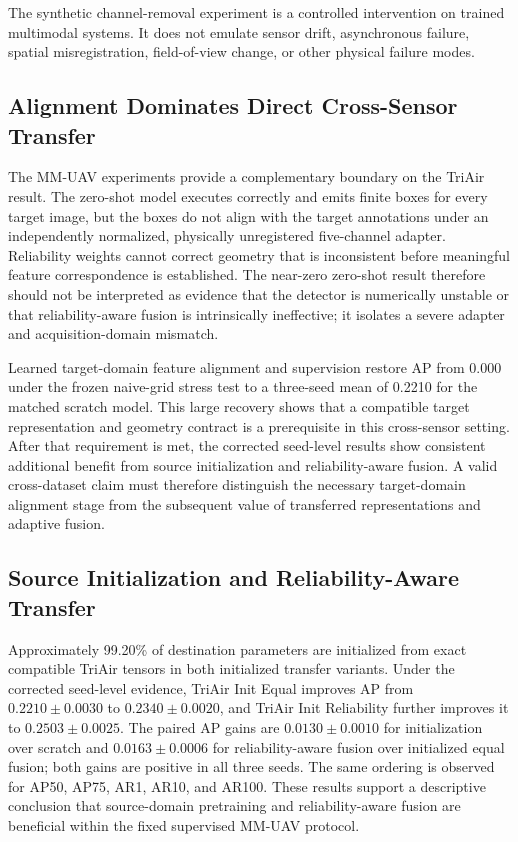 The synthetic channel-removal experiment is a controlled intervention on trained multimodal systems. It does not emulate sensor drift, asynchronous failure, spatial misregistration, field-of-view change, or other physical failure modes.

\subsection{Alignment Dominates Direct Cross-Sensor Transfer}
The MM-UAV experiments provide a complementary boundary on the TriAir result. The zero-shot model executes correctly and emits finite boxes for every target image, but the boxes do not align with the target annotations under an independently normalized, physically unregistered five-channel adapter. Reliability weights cannot correct geometry that is inconsistent before meaningful feature correspondence is established. The near-zero zero-shot result therefore should not be interpreted as evidence that the detector is numerically unstable or that reliability-aware fusion is intrinsically ineffective; it isolates a severe adapter and acquisition-domain mismatch.

Learned target-domain feature alignment and supervision restore AP from 0.000 under the frozen naive-grid stress test to a three-seed mean of 0.2210 for the matched scratch model. This large recovery shows that a compatible target representation and geometry contract is a prerequisite in this cross-sensor setting. After that requirement is met, the corrected seed-level results show consistent additional benefit from source initialization and reliability-aware fusion. A valid cross-dataset claim must therefore distinguish the necessary target-domain alignment stage from the subsequent value of transferred representations and adaptive fusion.

\subsection{Source Initialization and Reliability-Aware Transfer}
Approximately 99.20\% of destination parameters are initialized from exact compatible TriAir tensors in both initialized transfer variants. Under the corrected seed-level evidence, TriAir Init Equal improves AP from $0.2210\pm0.0030$ to $0.2340\pm0.0020$, and TriAir Init Reliability further improves it to $0.2503\pm0.0025$. The paired AP gains are $0.0130\pm0.0010$ for initialization over scratch and $0.0163\pm0.0006$ for reliability-aware fusion over initialized equal fusion; both gains are positive in all three seeds. The same ordering is observed for AP50, AP75, AR1, AR10, and AR100. These results support a descriptive conclusion that source-domain pretraining and reliability-aware fusion are beneficial within the fixed supervised MM-UAV protocol.

